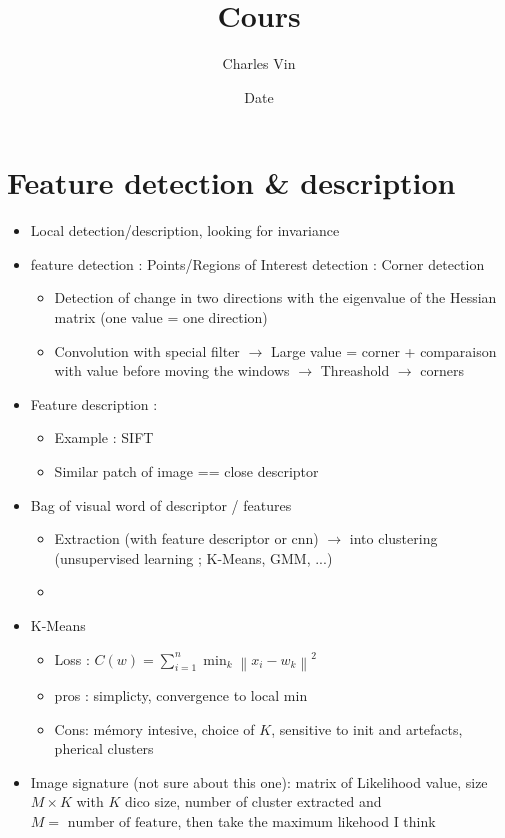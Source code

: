\documentclass{article}
\title{Cours}
\author{Charles Vin}
\date{Date}
\theoremstyle{plain}%
\theoremstyle{definition}
\theoremstyle{remark}
\begin{document}
\maketitle

\section{Feature detection \& description}
\begin{itemize}
    \item Local detection/description, looking for invariance
    \item feature detection : Points/Regions of Interest detection : Corner detection \begin{itemize}
        \item Detection of change in two directions with the eigenvalue of the Hessian matrix (one value = one direction)
        \item Convolution with special filter $\rightarrow$ Large value = corner + comparaison with value before moving the windows $\rightarrow$ Threashold $\rightarrow$ corners
    \end{itemize}
    \item Feature description : \begin{itemize}
        \item Example : SIFT
        \item Similar patch of image == close descriptor
    \end{itemize}
    \item Bag of visual word of descriptor / features \begin{itemize}
        \item Extraction (with feature descriptor or cnn) $\rightarrow$ into clustering (unsupervised learning ; K-Means, GMM, ...)
        \item
    \end{itemize}
    \item K-Means \begin{itemize}
        \item Loss : $ C(w) = \sum_{i=1}^{n} \min _k \left\| x_i - w_k  \right\| ^2 $
        \item pros : simplicty, convergence to local min
        \item Cons: mémory intesive, choice of $ K $, sensitive to init and artefacts, pherical clusters
    \end{itemize}
    \item Image signature (not sure about this one): matrix of Likelihood value, size $ M \times K $ with $ K  $ dico size, number of cluster extracted and $ M = \text{ number of feature} $, then take the maximum likehood I think
\end{itemize}
\end{document}
